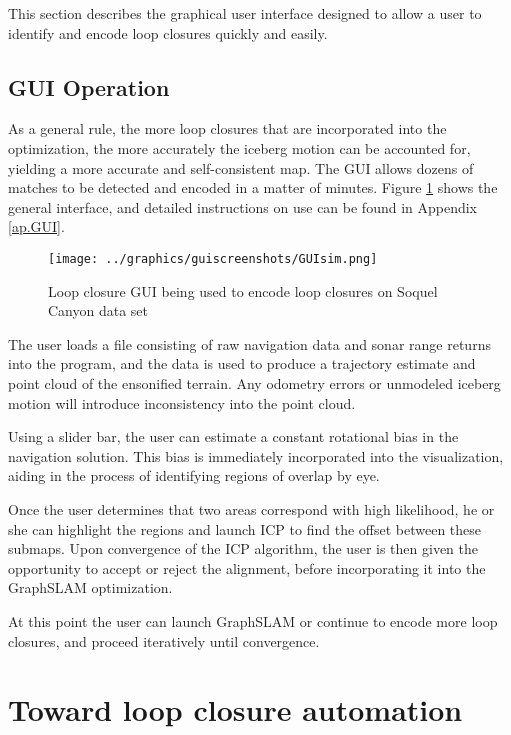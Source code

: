 This section describes the graphical user interface designed to allow a user to identify and encode loop closures quickly and easily. 

\subsection{GUI Operation}

As a general rule, the more loop closures that are incorporated into the optimization, the more accurately the iceberg motion can be accounted for, yielding a more accurate and self-consistent map. The GUI allows dozens of matches to be detected and encoded in a matter of minutes. Figure \ref{fig:GUI} shows the general interface, and detailed instructions on use can be found in Appendix \ref{ap.GUI}.

 \begin{figure}[ht]
   \centering
   \texttt{[image: ../graphics/guiscreenshots/GUIsim.png]} %
   \caption{Loop closure GUI being used to encode loop closures on Soquel Canyon data set }
   \label{fig:GUI}
\end{figure}

The user loads a file consisting of raw navigation data and sonar range returns into the program, and the data is used to produce a trajectory estimate and point cloud of the ensonified terrain. Any odometry errors or unmodeled iceberg motion will introduce inconsistency into the point cloud. 

Using a slider bar, the user can estimate a constant rotational bias in the navigation solution. This bias is immediately incorporated into the visualization, aiding in the process of identifying regions of overlap by eye. 

Once the user determines that two areas correspond with high likelihood, he or she can highlight the regions and launch ICP to find the offset between these submaps. Upon convergence of the ICP algorithm, the user is then given the opportunity to accept or reject the alignment, before incorporating it into the GraphSLAM optimization. 

At this point the user can launch GraphSLAM or continue to encode more loop closures, and proceed iteratively until convergence.


\section{Toward loop closure automation}

